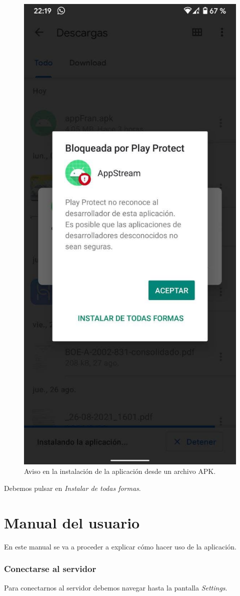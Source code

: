 \begin{itemize}
\begin{figure}[h!]
	\includegraphics[width=0.35\linewidth]{img/appinstall1}
	\caption{Aviso en la instalación de la aplicación desde un archivo APK.}
	\label{fig:appinstall1}
\end{figure}
	Debemos pulsar en \textit{Instalar de todas formas}.
\end{itemize}



\section{Manual del usuario}

En este manual se va a proceder a explicar cómo hacer uso de la aplicación.

\subsubsection{Conectarse al servidor}

Para conectarnos al servidor debemos navegar hasta la pantalla \textit{Settings}.

